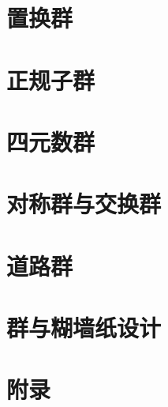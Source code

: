 \chapter{置换群}\label{section00410}



\chapter{正规子群}\label{section00411}


\chapter{四元数群}\label{section00412}


\chapter{对称群与交换群}\label{section00413}



\chapter{道路群}\label{section00414}



\chapter{群与糊墙纸设计}\label{section00415}



\chapter{附录}\label{section00416}


















